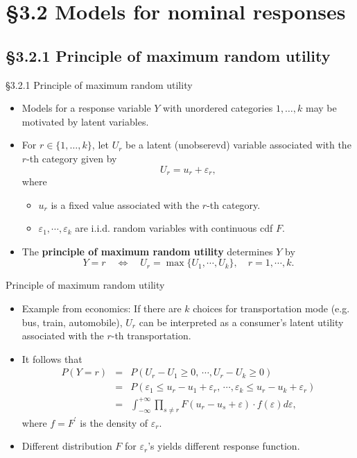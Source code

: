 \documentclass{beamer}
\newcommand{\currentsection}{}
\let\oldsection\section
\renewcommand{\section}[1]{\oldsection{#1}\renewcommand{\currentsection}{#1}}
\newcommand{\currentsubsection}{}
\let\oldsubsection\subsection
\renewcommand{\subsection}[1]{\oldsubsection{#1}\renewcommand{\currentsubsection}{#1}}
\newenvironment{wideitemize}%
  {\begin{itemize}%
    \setlength{\parskip}{1em}}%
  {\end{itemize}}
\begin{document}
\section{\S3.2 Models for nominal responses}
\subsection{\S3.2.1 Principle of maximum random utility}
\begin{frame}{\S3.2.1 Principle of maximum random utility}
\begin{wideitemize}
\item
Models for a response variable $Y$ with unordered categories $1, \dots, k$ may be motivated by latent variables.
\item
For $r \in \{1,\dots, k\}$, let $U_r$ be  a latent (unobserevd) variable associated with the $r$-th category given by 
\[
U_r=u_r+\varepsilon_r,
\]
where 
\begin{itemize}
\item $u_r$ is a fixed value associated with the $r$-th category.
\item $\varepsilon_1, \cdots, \varepsilon_k$ are i.i.d. random variables with continuous cdf $F$.
\end{itemize}
\item The \textbf{principle of maximum random utility} determines $Y$ by
\[
Y=r \quad \Leftrightarrow \quad U_r=\max\{ U_1, \cdots, U_k\},\quad r=1,\cdots, k.
\]
\end{wideitemize}
\end{frame}

\begin{frame}{ Principle of maximum random utility}
\begin{wideitemize}

\item Example from economics: If there are $k$ choices for transportation mode (e.g. bus, train, automobile), $U_r$ can be interpreted as a consumer's latent utility associated with the $r$-th transportation. 
\item 
It follows that {\small
\begin{eqnarray*}
P(Y=r) &=& P(U_r-U_1\geq 0, \, \cdots, U_r-U_k\geq 0) \\
& = & P(\varepsilon_1\leq u_r-u_1+\varepsilon_r,\,\cdots, \varepsilon_k\leq u_r-u_k+\varepsilon_r) \\
&=& \int_{-\infty}^{+\infty}\!\prod_{s\neq r} F(u_r\!-\!u_s\!+\!\varepsilon)\cdot f(\varepsilon)d\varepsilon,
\end{eqnarray*}}
where $f\!=\!F^\prime$ is the density of $\varepsilon_r$. 
\item
Different distribution $F$ for $\varepsilon_r$'s yields different response function.
\end{wideitemize}
\end{frame}
\end{document}
